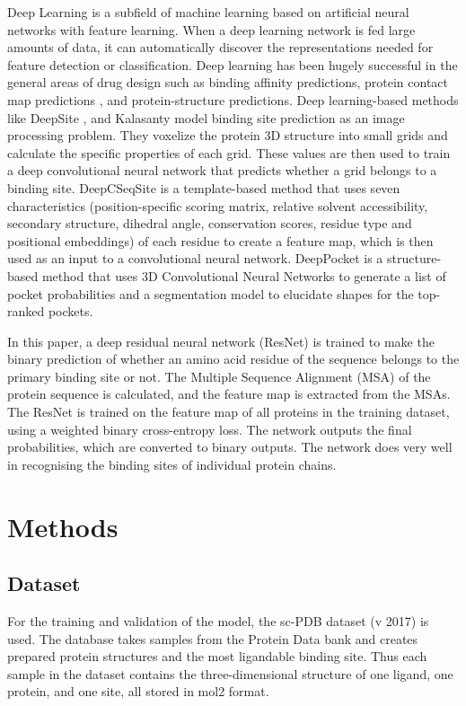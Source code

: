 \documentclass[journal=jacsat,manuscript=article]{achemso}
\begin{document}
Deep Learning is a subfield of machine learning based on artificial neural networks with feature learning. When a deep learning network is fed large amounts of data, it can automatically discover the representations needed for feature detection or classification. Deep learning has been hugely successful in the general areas of drug design such as binding affinity predictions\cite{jimenez2018k,ozturk2018deepdta}, protein contact map predictions \cite{hanson2018accurate,wang2017accurate}, and protein-structure predictions\cite{senior2020improved,li2019ensembling}\cite{tiwari2020network}. Deep learning-based methods like DeepSite \cite{jimenez2017deepsite}, and Kalasanty \cite{stepniewska2020improving} model binding site prediction as an image processing problem. They voxelize the protein 3D structure into small grids and calculate the specific properties of each grid. These values are then used to train a deep convolutional neural network that predicts whether a grid belongs to a binding site. DeepCSeqSite \cite{cui2019predicting} is a template-based method that uses seven characteristics (position-specific scoring matrix, relative solvent accessibility, secondary structure, dihedral angle, conservation scores, residue type and positional embeddings) of each residue to create a feature map, which is then used as an input to a convolutional neural network. DeepPocket \cite{aggarwal2021deeppocket} is a structure-based method that uses 3D Convolutional Neural Networks to generate a list of pocket probabilities and a segmentation model to elucidate shapes for the top-ranked pockets.

In this paper, a deep residual neural network (ResNet) is trained to make the binary prediction of whether an amino acid residue of the sequence belongs to the primary binding site or not. The Multiple Sequence Alignment (MSA) of the protein sequence is calculated, and the feature map is extracted from the MSAs. The ResNet is trained on the feature map of all proteins in the training dataset, using a weighted binary cross-entropy loss. The network outputs the final probabilities, which are converted to binary outputs. The network does very well in recognising the binding sites of individual protein chains.

\section{Methods}
\subsection{Dataset}
\quad For the training and validation of the model, the sc-PDB\cite{desaphy2015sc} dataset (v 2017) is used. The database takes samples from the Protein Data bank and creates prepared protein structures and the most ligandable binding site. Thus each sample in the dataset contains the three-dimensional structure of one ligand, one protein, and one site, all stored in mol2 format.
\end{document}
